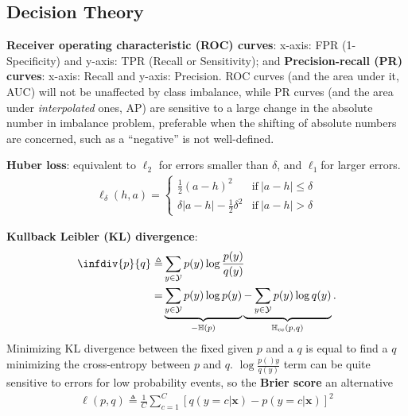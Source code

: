 \subsection{Decision Theory}



\textbf{Receiver operating characteristic (ROC) curves}: 
x-axis: FPR (1-Specificity) and y-axis: TPR (Recall or Sensitivity);
and \textbf{Precision-recall (PR) curves}:
x-axis: Recall and y-axis: Precision.
ROC curves (and the area under it, AUC) will not be unaffected by class imbalance,
while PR curves (and the area under \textit{interpolated} ones, AP) are sensitive to a large change in the absolute number in imbalance problem,
preferable when the shifting of absolute numbers are concerned, such as a ``negative'' is not well-defined.
 
\textbf{Huber loss}: equivalent to $\ell_2$ for errors smaller than $\delta$, 
and $\ell_1$for larger errors.
\begin{gather}
    \ell_\delta(h,a)=\left\{
    \begin{array}{ll}
        \frac{1}{2}(a-h)^2              & \text{if}~|a-h|\leq\delta\\
        \delta|a-h|-\frac{1}{2}\delta^2 & \text{if}~|a-h|>\delta
    \end{array}
    \right.
\end{gather}

\textbf{Kullback Leibler (KL) divergence}:
\begin{align}
    \infdiv{p}{q}
    \triangleq& \sum_{y\in\mathcal{Y}}p(y)\log\frac{p(y)}{q(y)}\\
    =& \underbrace{\sum_{y\in\mathcal{Y}}p(y)\log{p(y)}}_{-\mathbb{H}(p)}
        \underbrace{-\sum_{y\in\mathcal{Y}}p(y)\log{q(y)}}_{\mathbb{H}_\text{ce}(p,q)}.
\end{align}
Minimizing KL divergence between the fixed given $p$ and a $q$ is equal to find a $q$ minimizing the cross-entropy between $p$ and $q$.
$\log{\frac{p()y}{q(y)}}$ term can be quite sensitive to errors for low probability events,
so the \textbf{Brier score} an alternative
\begin{gather}
    \ell(p,q)\triangleq\frac{1}{C}\sum_{c=1}^C[q(y=c|\bm{x})-p(y=c|\bm{x})]^2
\end{gather}

